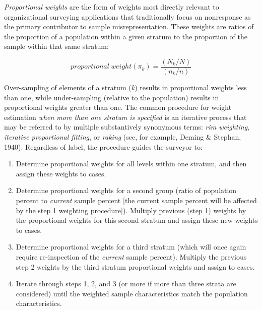 \documentclass[
  man,mask]{apa7}
\begin{document}
\emph{Proportional weights} are the form of weights most directly relevant to organizational surveying applications that traditionally focus on nonresponse as the primary contributor to sample misrepresentation. These weights are ratios of the proportion of a population within a given stratum to the proportion of the sample within that same stratum:

\begin{equation}
proportional \: weight(\pi_k) = \frac{(N_k/N)}{(n_k/n)}
\end{equation}

Over-sampling of elements of a stratum (\emph{k}) results in proportional weights less than one, while under-sampling (relative to the population) results in proportional weights greater than one.
The common procedure for weight estimation \emph{when more than one stratum is specified} is an iterative process that may be referred to by multiple substantively synonymous terms: \emph{rim weighting}, \emph{iterative proportional fitting}, or \emph{raking} (see, for example, Deming \& Stephan, 1940). Regardless of label, the procedure guides the surveyor to:

\begin{enumerate}
\def\labelenumi{\arabic{enumi})}
\item
  Determine proportional weights for all levels within one stratum, and then assign these weights to cases.
\item
  Determine proportional weights for a second group (ratio of population percent to \emph{current} sample percent {[}the current sample percent will be affected by the step 1 weighting procedure{]}). Multiply previous (step 1) weights by the proportional weights for this second stratum and assign these new weights to cases.
\item
  Determine proportional weights for a third stratum (which will once again require re-inspection of the \emph{current} sample percent). Multiply the previous step 2 weights by the third stratum proportional weights and assign to cases.
\item
  Iterate through steps 1, 2, and 3 (or more if more than three strata are considered) until the weighted sample characteristics match the population characteristics.
\end{enumerate}
\end{document}
